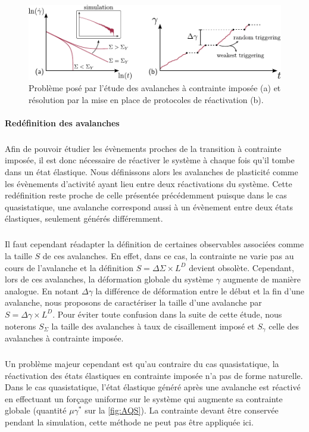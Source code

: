 \begin{figure}[h]
	\centering
	\includegraphics[width=\textwidth]{Chapitre4/Figures/Avalanches/PbContrainte.pdf}
	\caption{Problème posé par l'étude des avalanches à contrainte imposée (a) et résolution par la mise en place de protocoles de réactivation (b).}
	\label{fig:PbContrainte}
\end{figure}

\paragraph{Redéfinition des avalanches}

\subparagraph{}Afin de pouvoir étudier les évènements proches de la transition à contrainte imposée, il est donc nécessaire de réactiver le système à chaque fois qu'il tombe dans un état élastique. Nous définissons alors les avalanches de plasticité comme les évènements d'activité ayant lieu entre deux réactivations du système. Cette redéfinition reste proche de celle présentée précédemment puisque dans le cas quasistatique, une avalanche correspond aussi à un évènement entre deux états élastiques, seulement générés différemment.

\subparagraph{}Il faut cependant réadapter la définition de certaines observables associées comme la taille $S$ de ces avalanches. En effet, dans ce cas, la contrainte ne varie pas au cours de l'avalanche et la définition $S=\Delta\Sigma \times L^D$ devient obsolète. Cependant, lors de ces avalanches, la déformation globale du système $\gamma$ augmente de manière analogue. En notant $\Delta\gamma$ la différence de déformation entre le début et la fin d'une avalanche, nous proposons de caractériser la taille d'une avalanche par $S=\Delta\gamma \times L^D$. Pour éviter toute confusion dans la suite de cette étude, nous noterons $S_\Sigma$ la taille des avalanches à taux de cisaillement imposé et $S_\gamma$ celle des avalanches à contrainte imposée.

\subparagraph{}Un problème majeur cependant est qu'au contraire du cas quasistatique, la réactivation des états élastiques en contrainte imposée n'a pas de forme naturelle. Dans le cas quasistatique, l'état élastique généré après une avalanche est réactivé en effectuant un forçage uniforme sur le système qui augmente sa contrainte globale (quantité $\mu\gamma^*$ sur la \autoref{fig:AQS}). La contrainte devant être conservée pendant la simulation, cette méthode ne peut pas être appliquée ici.

